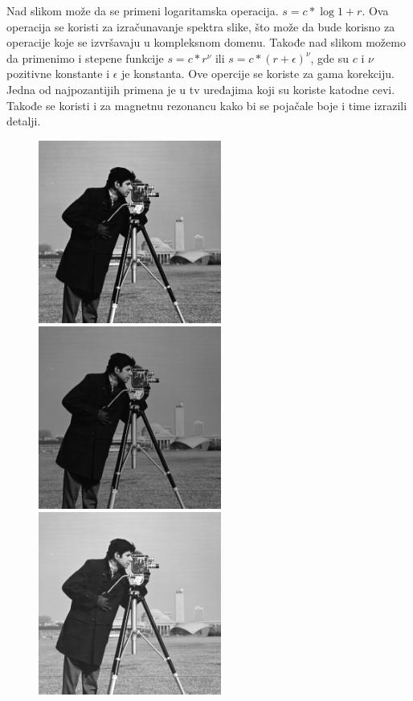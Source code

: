 \documentclass[a4paper,12pt,titlepage]{article}
\begin{document}
Nad slikom može da se primeni logaritamska operacija. $s = c*\log{1+ r}$. Ova operacija se koristi za izračunavanje spektra slike, što može da bude korisno za operacije koje se izvršavaju u kompleksnom domenu. Takođe nad slikom možemo da primenimo i stepene funkcije $s  = c*r^{\nu}$ ili $s = c*(r + \epsilon)^{\nu}$, gde su $c$ i $\nu$ pozitivne konstante i $\epsilon$ je konstanta. Ove opercije se koriste za gama korekciju. Jedna od najpozantijih primena je u tv uređajima koji su koriste katodne cevi. Takođe se koristi i za magnetnu rezonancu kako bi se pojačale boje i time izrazili detalji. 

\begin{figure}[ht!]
\centering
\includegraphics[width=60mm]{img/img.png}
\includegraphics[width=60mm]{img/imgLog.png}
\includegraphics[width=60mm]{img/imgPow1.png}

\end{figure}
\end{document}
